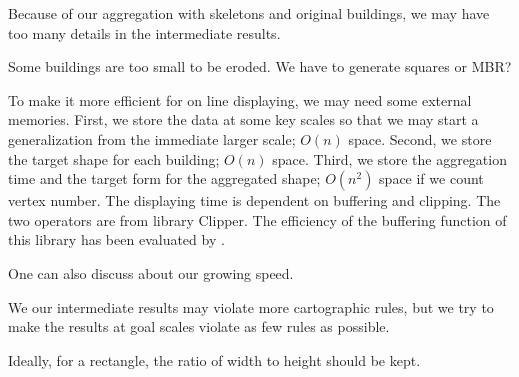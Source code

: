 \documentclass[graybox]{svmult}
\begin{document}
Because of our aggregation with skeletons and original 
buildings, we may have too many details in the intermediate 
results.

Some buildings are too small to be eroded. We have to generate 
squares or MBR?

To make it more efficient for on line displaying, we may need 
some external memories. First, we store the data at some key 
scales so that we may start a generalization from the immediate 
larger scale; $O(n)$ space. Second, we store the target shape 
for each building; $O(n)$ space. Third, we store the aggregation 
time and the target form for the aggregated shape; $O(n^2)$ 
space if we count vertex number.
%
The displaying time is dependent on buffering and clipping. The 
two operators are from library Clipper. The efficiency of the 
buffering function of this library has been evaluated by 
\textcite{Palfrader2015}.

One can also discuss about our growing speed.

We our intermediate results may violate more cartographic rules, but we try to 
make the results at goal scales violate as few rules as possible.

Ideally, for a rectangle, the ratio of width to height should be kept. 


\printbibliography
%
%
\end{document}
